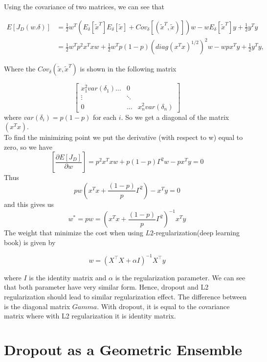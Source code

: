 \documentclass{amsart}
\theoremstyle{definition}
\theoremstyle{remark}
\numberwithin{equation}{section}
\begin{document}
Using the covariance of two matrices, we can see that

\begin{equation}
\begin{split}
E\left[J_D(w.\delta)\right]&=\frac{1}{2} w^T \left(E_\delta[\tilde{x}^T]E_\delta[\tilde{x}] +Cov_\delta \left [(\tilde{x}^T, \tilde{x})\right]\right)w -w E_\delta[\tilde{x}^T]y +\frac{1}{2}y^Ty\\
&= \frac{1}{2}w^T p^2 x^T x w+ \frac{1}{2}w^T p(1-p) \left( diag(x^T x)^{1/2}\right)^2 w -wpx^Ty+\frac{1}{2}y^Ty,
\end{split}
\end{equation}

Where the  $Cov_\delta(\tilde{x},\tilde{x}^T)$ is shown in the following matrix

\[
\begin{bmatrix}
    x_{1}^2 var(\delta_1)  \hdots & 0 \\

    \vdots   & \ddots \\
   0 & \dots  & x_{n}^2 var(\delta_n)
\end{bmatrix}
\]
where $var(\delta_i)=p(1-p)$ for each $i$. So we get a diagonal of the matrix $(x^Tx)$.\\
To find the minimizing point we put the derivative (with respect to w) equal to zero, so we have
\begin{equation}\label{Dropout}
\left[\frac{\partial E[J_D]}{\partial w}\right]= p^2 x^Txw+p(1-p) \Gamma^2 w- px^Ty=0
\end{equation}
 Thus
 $$pw\left( x^Tx+ \frac{(1-p)}{p} \Gamma^2\right) -x^Ty=0$$
 and this gives us
 $$w^*= pw = \left( x^Tx+\frac{(1-p)}{p}\Gamma^2\right)^{-1}x^Ty$$
The weight that minimize the cost when using $L2$-regularization(deep learning book) is given by

\begin{equation}
 w = \left(X^{\top}X + \alpha I\right)^{-1}X^{\top}y
\end{equation}

where $I$ is the identity matrix and $\alpha$ is the regularization parameter.
We can see that both parameter have very similar form. Hence, dropout and L2
regularization should lead to similar regularization effect. The difference
between is the diagonal matrix $Gamma$. With dropout,
it is equal to the covariance matrix where with L2 regularization it is identity matrix.

\section{Dropout as a Geometric Ensemble}
\end{document}
